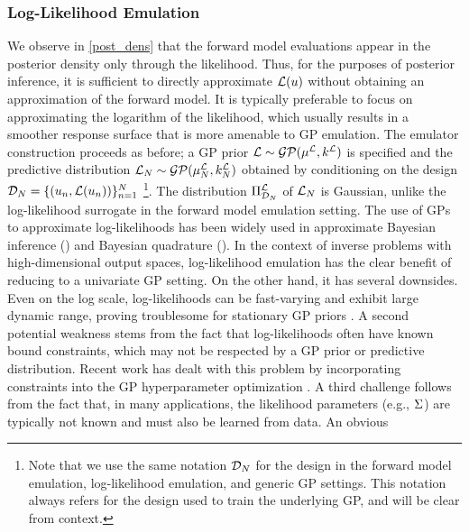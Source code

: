 \documentclass[12pt]{article}
\begin{document}
\subsubsection{Log-Likelihood Emulation}
We observe in \ref{post_dens} that the forward model evaluations appear in the posterior density only through the 
likelihood. Thus, for the purposes of posterior inference, it is sufficient to directly approximate $\llik(\Par)$ without 
obtaining an approximation of the forward model. It is typically preferable to focus on approximating the logarithm 
of the likelihood, which usually results in a smoother response surface that is more amenable to GP emulation. 
The emulator construction proceeds as before; a GP prior $\llik \sim \GP(\emMeanPrior{\llik}, \emKerPrior{\llik})$ 
is specified and the predictive 
distribution $\llikEm[\Ndesign] \sim \GP(\emMean[\Ndesign]{\llik}, \emKer[\Ndesign]{\llik})$ obtained by 
conditioning on the design $\design[\Ndesign] = \{(\Par_{\idxDesign}, \llik(\Par_{\idxDesign}))\}_{\idxDesign=1}^{\Ndesign}$
\footnote{Note that we use the same notation $\design[\Ndesign]$ for the design in the forward model emulation, 
log-likelihood emulation, and generic GP settings. This notation always refers for the design used to train the underlying
GP, and will be clear from context.}. The distribution $\emLaw{\llik}$ of $\llikEm[\Ndesign]$ is Gaussian, unlike
the log-likelihood surrogate in the forward model emulation setting. 
The use of GPs to approximate log-likelihoods has been widely used in approximate Bayesian inference 
(\cite{VehtariParallelGP, Kandasamy_2017, llikRBF, trainDynamics, quantileApprox, wang2018adaptive, landslideCalibration})
and Bayesian quadrature (\cite{BayesQuadrature, BayesQuadRatios}). In the context of inverse problems with 
high-dimensional output spaces, log-likelihood emulation has the clear benefit of reducing to a univariate GP setting. 
On the other hand, it has several downsides. Even on the log scale, log-likelihoods can be fast-varying and exhibit large 
dynamic range, proving troublesome for stationary GP priors \cite{wang2018adaptive}. A second potential weakness 
stems from the fact that log-likelihoods often have known bound constraints, which may not be respected by a GP 
prior or predictive distribution. Recent work has dealt with this problem by incorporating constraints into the 
GP hyperparameter optimization \cite{quantileApprox}. A third challenge follows from the fact that, in many applications, 
the likelihood parameters (e.g., $\likPar$) are typically not known and must also be learned from data. An obvious 
\end{document}
